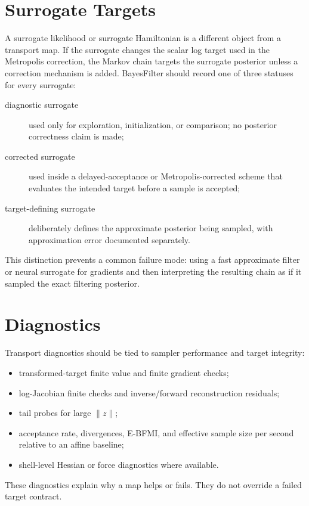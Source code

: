 \section{Surrogate Targets}
\label{sec:bf-surrogate-targets}

A surrogate likelihood or surrogate Hamiltonian is a different object from a
transport map.  If the surrogate changes the scalar log target used in the
Metropolis correction, the Markov chain targets the surrogate posterior unless
a correction mechanism is added.  BayesFilter should record one of three
statuses for every surrogate:
\begin{description}
  \item[diagnostic surrogate] used only for exploration, initialization, or
    comparison; no posterior correctness claim is made;
  \item[corrected surrogate] used inside a delayed-acceptance or
    Metropolis-corrected scheme that evaluates the intended target before a
    sample is accepted;
  \item[target-defining surrogate] deliberately defines the approximate
    posterior being sampled, with approximation error documented separately.
\end{description}
This distinction prevents a common failure mode: using a fast approximate
filter or neural surrogate for gradients and then interpreting the resulting
chain as if it sampled the exact filtering posterior.

\section{Diagnostics}
\label{sec:bf-transport-diagnostics}

Transport diagnostics should be tied to sampler performance and target
integrity:
\begin{itemize}
  \item transformed-target finite value and finite gradient checks;
  \item log-Jacobian finite checks and inverse/forward reconstruction residuals;
  \item tail probes for large $\|z\|$;
  \item acceptance rate, divergences, E-BFMI, and effective sample size per
    second relative to an affine baseline;
  \item shell-level Hessian or force diagnostics where available.
\end{itemize}
These diagnostics explain why a map helps or fails.  They do not override a
failed target contract.

